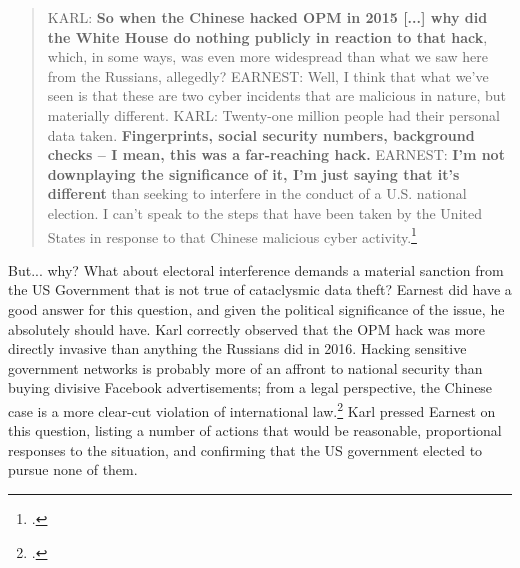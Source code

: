 \documentclass{memoir}
\begin{document}
\begin{refsegment}
\begin{quote}
KARL: \textbf{So when the Chinese hacked OPM in 2015 [...] why did the White House do nothing publicly in reaction to that hack}, which, in some ways, was even more widespread than what we saw here from the Russians, allegedly?
\newline \newline
EARNEST: Well, I think that what we've seen is that these are two cyber incidents that are malicious in nature, but materially different.
\newline \newline
KARL: Twenty-one million people had their personal data taken.  \textbf{Fingerprints, social security numbers, background checks -- I mean, this was a far-reaching hack.}
\newline \newline
EARNEST: \textbf{I'm not downplaying the significance of it, I'm just saying that it's different} than seeking to interfere in the conduct of a U.S. national election. I can't speak to the steps that have been taken by the United States in response to that Chinese malicious cyber activity.\footcite[Transcript adapted from the official White House website.]{earnest_press_2017}
\end{quote}
But... why? What about electoral interference demands a material sanction from the US Government that is not true of cataclysmic data theft? Earnest did have a good answer for this question, and given the political significance of the issue, he absolutely should have. Karl correctly observed that the OPM hack was more directly invasive than anything the Russians did in 2016. Hacking sensitive government networks is probably more of an affront to national security than buying divisive Facebook advertisements; from a legal perspective, the Chinese case is a more clear-cut violation of international law.\footcite[p.~625]{terry_dont_2018} Karl pressed Earnest on this question, listing a number of actions that would be reasonable, proportional responses to the situation, and confirming that the US government elected to pursue none of them.


\end{refsegment}
\end{document}
